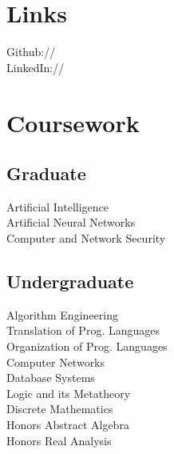 \documentclass[]{deedy-resume-openfont}
\begin{document}
\begin{minipage}[t]{0.33\textwidth}
\section{Links} 
Github:// \href{https://github.com/rileyannis}{} \\
LinkedIn://  \href{https://www.linkedin.com/in/rileyannis}{} \\
\sectionsep


\section{Coursework}
\subsection{Graduate}
Artificial Intelligence\\
Artificial Neural Networks\\
Computer and Network Security\\
\sectionsep

\subsection{Undergraduate}
Algorithm Engineering\\
Translation of Prog. Languages\\
Organization of Prog. Languages\\
Computer Networks\\
Database Systems\\
Logic and its Metatheory\\
Discrete Mathematics\\
Honors Abstract Algebra\\
Honors Real Analysis\\
\sectionsep



\end{minipage}
\end{document}
